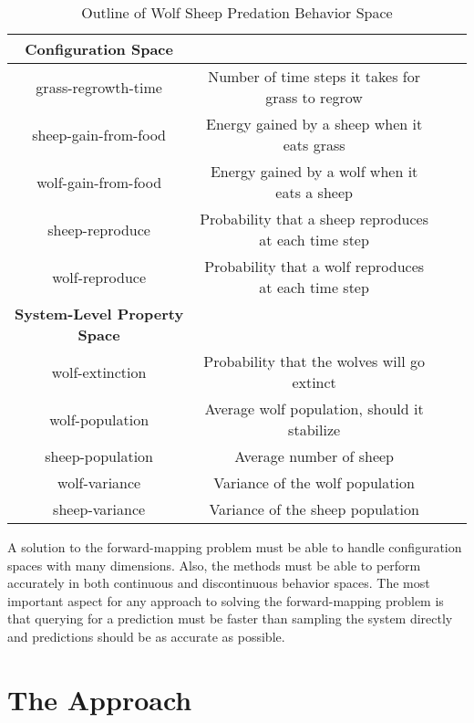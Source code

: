 \begin{table}[ht]
  \caption{Outline of Wolf Sheep Predation Behavior Space}
  \centering
  \begin{tabular}{c c c c}
    \hline \hline
    \textbf{Configuration Space} \\
    \hline
    grass-regrowth-time & Number of time steps it takes for grass to regrow \\
    sheep-gain-from-food & Energy gained by a sheep when it eats grass \\ 
    wolf-gain-from-food & Energy gained by a wolf when it eats a sheep \\
    sheep-reproduce & Probability that a sheep reproduces at each time step \\
    wolf-reproduce & Probability that a wolf reproduces at each time step\\
    \hline \hline
    \textbf{System-Level Property Space} \\
    \hline
    wolf-extinction & Probability that the wolves will go extinct \\
    wolf-population & Average wolf population, should it stabilize \\
    sheep-population & Average number of sheep \\
    wolf-variance & Variance of the wolf population \\
    sheep-variance & Variance of the sheep population \\
    \hline


  \end{tabular}
  \label{table:ws_parameters}
\end{table}



A solution to the forward-mapping problem must be able to handle configuration spaces with many dimensions.
Also, the methods must be able to perform accurately in both continuous and discontinuous behavior spaces.
The most important aspect for any approach to solving the forward-mapping problem is that querying for a prediction must be faster than sampling the system directly and predictions should be as accurate as possible.

\section{The \fw Approach}

